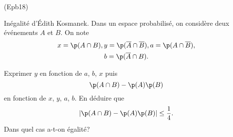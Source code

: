 \begin{tiny}(Epb18)\end{tiny} Inégalité d'\'Edith Kosmanek. Dans un espace probabilisé, on considère deux événements $A$ et $B$. On note
\begin{multline*}
  x= \p(A\cap B), y= \p(\overline{A}\cap \overline{B}), a= \p(A\cap \overline{B}),\\
  b = \p(\overline{A}\cap B).
\end{multline*}

Exprimer $y$ en fonction de $a$, $b$, $x$ puis 
\begin{displaymath}
  \p(A\cap B) - \p(A)\p(B)
\end{displaymath}
en fonction de $x$, $y$, $a$, $b$. En déduire que 
\begin{displaymath}
  \left| \p(A\cap B) - \p(A)\p(B)\right| \leq \frac{1}{4}.
\end{displaymath}
Dans quel cas a-t-on égalité?
